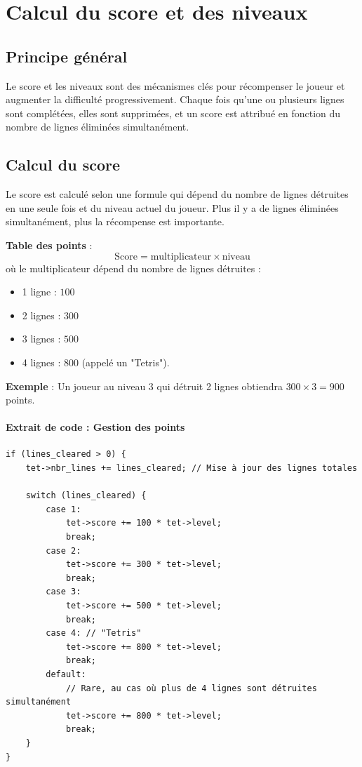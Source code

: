 \documentclass[12pt,a4paper]{report}
\begin{document}
\section{Calcul du score et des niveaux}

\subsection{Principe général}
Le score et les niveaux sont des mécanismes clés pour récompenser le joueur et augmenter la difficulté progressivement. Chaque fois qu’une ou plusieurs lignes sont complétées, elles sont supprimées, et un score est attribué en fonction du nombre de lignes éliminées simultanément.

\subsection{Calcul du score}
Le score est calculé selon une formule qui dépend du nombre de lignes détruites en une seule fois et du niveau actuel du joueur. Plus il y a de lignes éliminées simultanément, plus la récompense est importante.

\textbf{Table des points} :
\[
\text{Score} = \text{multiplicateur} \times \text{niveau}
\]
où le multiplicateur dépend du nombre de lignes détruites :
\begin{itemize}
    \item 1 ligne : \(100\)
    \item 2 lignes : \(300\)
    \item 3 lignes : \(500\)
    \item 4 lignes : \(800\) (appelé un "Tetris").
\end{itemize}

\textbf{Exemple} : Un joueur au niveau 3 qui détruit 2 lignes obtiendra \(300 \times 3 = 900\) points.

\paragraph{Extrait de code : Gestion des points}
\begin{lstlisting}
if (lines_cleared > 0) {
    tet->nbr_lines += lines_cleared; // Mise à jour des lignes totales

    switch (lines_cleared) {
        case 1:
            tet->score += 100 * tet->level;
            break;
        case 2:
            tet->score += 300 * tet->level;
            break;
        case 3:
            tet->score += 500 * tet->level;
            break;
        case 4: // "Tetris"
            tet->score += 800 * tet->level;
            break;
        default:
            // Rare, au cas où plus de 4 lignes sont détruites simultanément
            tet->score += 800 * tet->level;
            break;
    }
}
\end{lstlisting}
\end{document}
